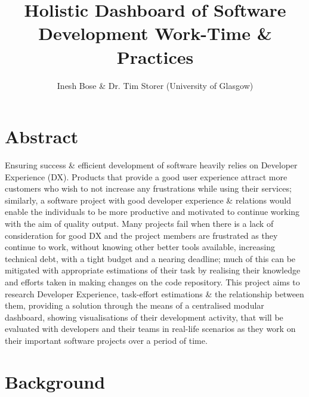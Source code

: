 \documentclass{prrcs}
\begin{document}
\title{%
    \vspace{-0.75cm}%
    Holistic Dashboard of Software\\Development Work-Time \& Practices%
}

\author{%
    \vspace{-0.5cm}%
    Inesh Bose \& Dr. Tim Storer (University of Glasgow)%
}

\date{}

\maketitle

\section*{Abstract}

Ensuring success \& efficient development of software heavily relies on Developer Experience (DX). Products that provide a good user experience attract more customers who wish to not increase any frustrations while using their services; similarly, a software project with good developer experience \& relations would enable the individuals to be more productive and motivated to continue working with the aim of quality output. Many projects fail when there is a lack of consideration for good DX and the project members are frustrated as they continue to work, without knowing other better tools available, increasing technical debt, with a tight budget and a nearing deadline; much of this can be mitigated with appropriate estimations of their task by realising their knowledge and efforts taken in making changes on the code repository. This project aims to research Developer Experience, task-effort estimations \& the relationship between them, providing a solution through the means of a centralised modular dashboard, showing visualisations of their development activity, that will be evaluated with developers and their teams in real-life scenarios as they work on their important software projects over a period of time.

\section{Background}

\end{document}
